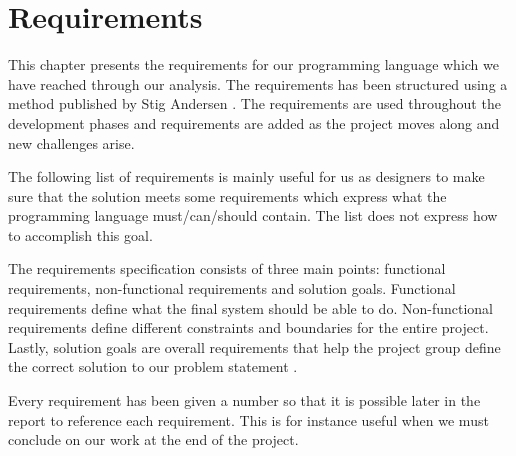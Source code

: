 \chapter{Requirements}
\label{chap:requirements}
This chapter presents the requirements for our programming language which we
have reached through our analysis. The requirements has been structured using a
method published by Stig Andersen \cite{requirementsGuide}. The requirements are
used throughout the development phases and requirements are added as the project
moves along and new challenges arise. 


The following list of requirements is mainly useful for us as designers to make
sure that the solution meets some requirements which express what the
programming language must/can/should contain. The list does not express how to
accomplish this goal.

The requirements specification consists of three main points: functional
requirements, non-functional requirements and solution goals. Functional
requirements define what the final system should be able to do. Non-functional
requirements define different constraints and boundaries for the entire project.
Lastly, solution goals are overall requirements that help the project group
define the correct solution to our problem statement \cite{requirementsGuide}.

Every requirement has been given a number so that it is possible later in the
report to reference each requirement. This is for instance useful when we must
conclude on our work at the end of the project.



